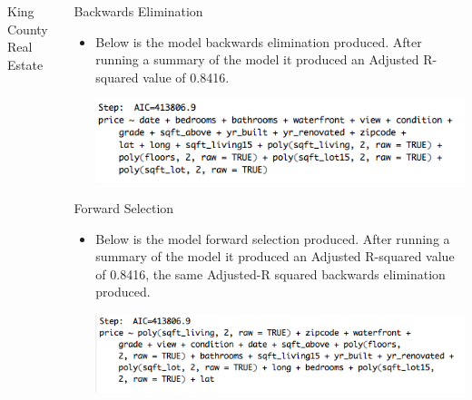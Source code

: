 \documentclass[final]{beamer}\usepackage[]{graphicx}\usepackage[]{color}
\makeatletter
\newenvironment{kframe}{%
 \def\at@end@of@kframe{}%
 \ifinner\ifhmode%
  \def\at@end@of@kframe{\end{minipage}}%
  \begin{minipage}{\columnwidth}%
 \fi\fi%
 \def\FrameCommand##1{\hskip\@totalleftmargin \hskip-\fboxsep
 \colorbox{shadecolor}{##1}\hskip-\fboxsep
     \hskip-\linewidth \hskip-\@totalleftmargin \hskip\columnwidth}%
 \MakeFramed {\advance\hsize-\width
   \@totalleftmargin\z@ \linewidth\hsize
   \@setminipage}}%
 {\par\unskip\endMakeFramed%
 \at@end@of@kframe}
\newenvironment{knitrout}{}{} %
\makeatother
\begin{document}
\begin{frame}[fragile]
\begin{columns}[t]
\begin{column}{0.31\linewidth}
\begin{minipage}[t][.955\textheight]{\linewidth}
\begin{block}{King County Real Estate}
\begin{knitrout}
\begin{kframe}
{\ttfamily\noindent\bfseries{}}\end{kframe}
\end{knitrout}
\vspace{0ex}
\end{block}
\vfill

\end{minipage}
\end{column}%

\begin{column}{0.31\linewidth}
\begin{minipage}[t][.955\textheight]{\linewidth} 

\vspace{0ex}
\begin{block}{Backwards Elimination}
\begin{itemize}
\item Below is the model backwards elimination produced. After running a summary of the model it produced an Adjusted R-squared value of  0.8416. 
\vspace{1ex}
\begin{center}\includegraphics[width=12in]{picture1.png}\end{center}
\end{itemize}
\vspace{0ex}
\end{block}
\vfill

\vspace{0ex}
\begin{block}{Forward Selection}
\begin{itemize}
\item Below is the model forward selection produced. After running a summary of the model it produced an Adjusted R-squared value of  0.8416, the same Adjusted-R squared backwards elimination produced. \vspace{1ex}
\begin{center}\includegraphics[width=12in]{picture2.png}\end{center}
\end{itemize}
\vspace{0ex}
\end{block}
\vfill


\end{minipage}
\end{column}
\end{columns}
\end{frame}
\end{document}
